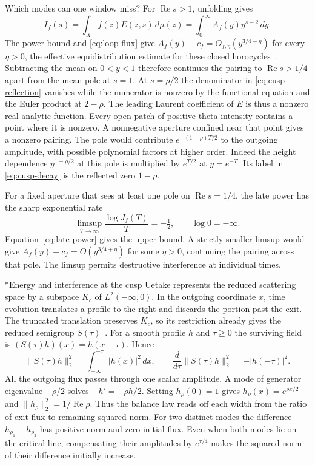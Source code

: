 \documentclass[11pt,letterpaper]{article}
\makeatletter
\renewcommand\subsection{\@startsection{subsection}{2}{\z@}{-2.0ex plus -.3ex}{.75ex}{\normalfont\normalsize\itshape}}
\numberwithin{equation}{section}
\makeatother
\begin{document}
Which modes can one window miss? For $\operatorname{Re}s>1$, unfolding gives
\[
 I_f(s)=\int_X f(z)E(z,s)\,d\mu(z)
       =\int_0^\infty A_f(y)y^{s-2}\,dy .
\]
The power bound and \eqref{eq:loop-flux} give $A_f(y)-c_f=O_{f,\eta}(y^{3/4-\eta})$ for every $\eta>0$, the effective equidistribution estimate for these closed horocycles~\cite{zagier,horoequid}. Subtracting the mean on $0<y<1$ therefore continues the pairing to $\operatorname{Re}s>1/4$ apart from the mean pole at $s=1$. At $s=\rho/2$ the denominator in \eqref{eq:cusp-reflection} vanishes while the numerator is nonzero by the functional equation and the Euler product at $2-\rho$. The leading Laurent coefficient of $E$ is thus a nonzero real-analytic function. Every open patch of positive theta intensity contains a point where it is nonzero. A nonnegative aperture confined near that point gives a nonzero pairing. The pole would contribute $e^{-(1-\rho)T/2}$ to the outgoing amplitude, with possible polynomial factors at higher order. Indeed the height dependence $y^{1-\rho/2}$ at this pole is multiplied by $e^{T/2}$ at $y=e^{-T}$. Its label in \eqref{eq:cusp-decay} is the reflected zero $1-\rho$.

For a fixed aperture that sees at least one pole on $\operatorname{Re}s=1/4$, the late power has the sharp exponential rate
\[
  \limsup_{T\to\infty}\frac{\log J_f(T)}{T}=-\tfrac12,
 \qquad \log0=-\infty .
\]
Equation~\eqref{eq:late-power} gives the upper bound. A strictly smaller limsup would give $A_f(y)-c_f=O(y^{3/4+\eta})$ for some $\eta>0$, continuing the pairing across that pole. The limsup permits destructive interference at individual times.

\subsection*{Energy and interference at the cusp}\label{app:outgoing-flux}
Uetake represents the reduced scattering space by a subspace $K_c$ of $L^2(-\infty,0)$. In the outgoing coordinate $x$, time evolution translates a profile to the right and discards the portion past the exit. The truncated translation preserves $K_c$, so its restriction already gives the reduced semigroup $S(\tau)$~\cite[Theorems~4.4 and~5.1]{uetake}. For a smooth profile $h$ and $\tau\ge0$ the surviving field is $(S(\tau)h)(x)=h(x-\tau)$. Hence
\[
 \|S(\tau)h\|_2^2=\int_{-\infty}^{-\tau}|h(x)|^2\,dx,\qquad
 \frac{d}{d\tau}\|S(\tau)h\|_2^2=-|h(-\tau)|^2 .
\]
All the outgoing flux passes through one scalar amplitude. A mode of generator eigenvalue $-\rho/2$ solves $-h'=-\rho h/2$. Setting $h_\rho(0)=1$ gives $h_\rho(x)=e^{\rho x/2}$ and $\|h_\rho\|_2^2=1/\operatorname{Re}\rho$. Thus the balance law reads off each width from the ratio of exit flux to remaining squared norm. For two distinct modes the difference $h_{\rho_1}-h_{\rho_2}$ has positive norm and zero initial flux. Even when both modes lie on the critical line, compensating their amplitudes by $e^{\tau/4}$ makes the squared norm of their difference initially increase.
\end{document}
